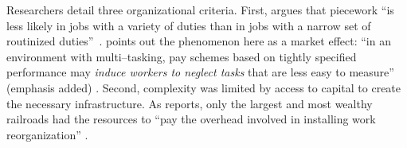\documentclass[trackingWork]{subfiles}
\begin{document}
Researchers detail three organizational criteria.
First, \citeauthor{Brown01041990} argues that piecework ``is less likely in jobs with
a variety of duties than in jobs with a narrow set of routinized duties''~\cite{Brown01041990}.
\citeauthor{SJOE:SJOE371} points out the phenomenon here as a market effect:
``in an environment with multi--tasking, pay schemes based on tightly specified performance may \textit{induce workers to neglect tasks} that are less easy to measure''
(emphasis added) \cite{SJOE:SJOE371}.
Second, complexity was limited by access to capital to create the necessary infrastructure.
As \citeauthor{10.2307/23702539} reports, %
only the largest and most wealthy railroads had the resources to ``pay the overhead involved in installing work reorganization'' \cite{10.2307/23702539}.
\end{document}
